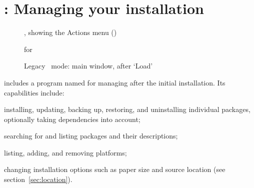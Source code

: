 \documentclass{article}
\begin{document}
%
%
%


\section{: Managing your installation}
\label{sec:tlmgr}

\begin{figure}[tb]
\caption{ \GUI, showing the Actions menu (\MacOSX)}
\label{fig:tlshell}
\end{figure}

\begin{figure}[tb]
\caption{ \GUI{} for }
\label{fig:tlcockpit}
\end{figure}

\begin{figure}[tb]
\caption{Legacy  \GUI\ mode: main window, after `Load'}
\label{fig:tlmgr-gui}
\end{figure}

\TL{} includes a program named  for managing \TL{} after the
initial installation.  Its capabilities include:

\begin{itemize*}
\item installing, updating, backing up, restoring, and uninstalling
  individual packages, optionally taking dependencies into account;
\item searching for and listing packages and their descriptions;
\item listing, adding, and removing platforms;
\item changing installation options such as paper size and source
  location (see section~\ref{sec:location}).
\end{itemize*}
\end{document}
